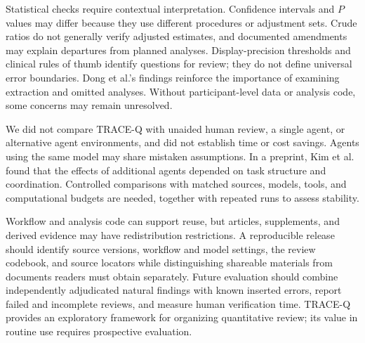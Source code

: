 \documentclass[12pt,a4paper]{article}
\begin{document}
Statistical checks require contextual interpretation. Confidence intervals and $P$ values may differ because they use different procedures or adjustment sets. Crude ratios do not generally verify adjusted estimates, and documented amendments may explain departures from planned analyses. Display-precision thresholds and clinical rules of thumb identify questions for review; they do not define universal error boundaries. Dong et al.'s findings reinforce the importance of examining extraction and omitted analyses.\cite{dong2026statistical} Without participant-level data or analysis code, some concerns may remain unresolved.

We did not compare TRACE-Q with unaided human review, a single agent, or alternative agent environments, and did not establish time or cost savings. Agents using the same model may share mistaken assumptions. In a preprint, Kim et al. found that the effects of additional agents depended on task structure and coordination.\cite{kim2026scaling} Controlled comparisons with matched sources, models, tools, and computational budgets are needed, together with repeated runs to assess stability.

Workflow and analysis code can support reuse, but articles, supplements, and derived evidence may have redistribution restrictions. A reproducible release should identify source versions, workflow and model settings, the review codebook, and source locators while distinguishing shareable materials from documents readers must obtain separately. Future evaluation should combine independently adjudicated natural findings with known inserted errors, report failed and incomplete reviews, and measure human verification time. TRACE-Q provides an exploratory framework for organizing quantitative review; its value in routine use requires prospective evaluation.

\end{document}
